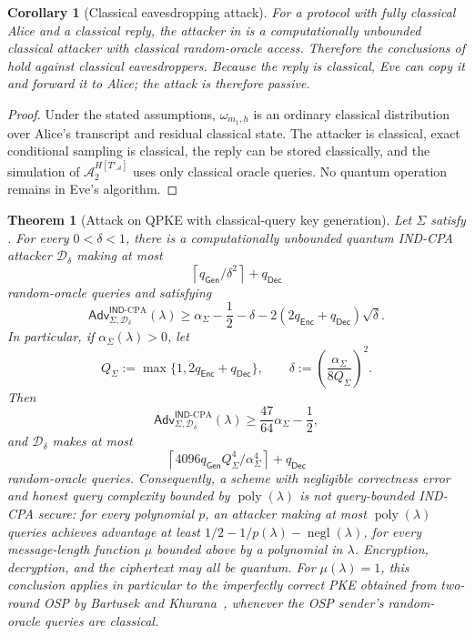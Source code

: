 \documentclass[11pt]{article}
\newcounter{algorithm}
\newtheorem{theorem}{Theorem}[section]
\newtheorem{corollary}[corollary]{Corollary}
\newcommand{\cA}{\mathcal{A}}
\newcommand{\cD}{\mathcal{D}}
\newcommand{\poly}{\operatorname{poly}}
\newcommand{\negl}{\operatorname{negl}}
\newcommand{\Adv}{\mathsf{Adv}}
\newcommand{\Gen}{\mathsf{Gen}}
\newcommand{\Enc}{\mathsf{Enc}}
\newcommand{\Dec}{\mathsf{Dec}}
\newcommand{\IND}{\mathsf{IND}}
\newcommand{\ceil}[1]{\left\lceil #1\right\rceil}
\begin{document}
\begin{corollary}[Classical eavesdropping attack]\label{cor:classical}
For a protocol with fully classical Alice and a classical reply, the
attacker in  is a computationally unbounded classical
attacker with classical random-oracle access.  Therefore the conclusions of
 hold against classical
eavesdroppers. Because the reply is classical, Eve can copy it and forward
it to Alice; the attack is therefore passive.
\end{corollary}

\begin{proof}
Under the stated assumptions, \(\omega_{m_1,h}\) is an ordinary classical
distribution over Alice's transcript and residual classical state.  The
attacker is classical, exact conditional sampling is classical, the reply can
be stored classically, and the simulation of \(\cA_2^{H[T'_{\cA}]}\) uses
only classical oracle queries.  No quantum operation remains in Eve's
algorithm.
\end{proof}

\begin{theorem}[Attack on QPKE with classical-query key generation]
\label{thm:qpke}
Let \(\Sigma\) satisfy .  For every \(0<\delta<1\), there is
a computationally unbounded quantum IND-CPA attacker \(\cD_\delta\) making
at most
\[
  \ceil{q_{\Gen}/\delta^2}+q_{\Dec}
\]
random-oracle queries and satisfying
\[
  \Adv^{\IND\text{-}\mathrm{CPA}}_{\Sigma,\cD_\delta}(\lambda)
  \ge
  \alpha_\Sigma-\frac12-\delta
  -2(2q_{\Enc}+q_{\Dec})\sqrt\delta.
\]
In particular, if \(\alpha_\Sigma(\lambda)>0\), let
\[
  Q_\Sigma:=\max\{1,2q_{\Enc}+q_{\Dec}\},
  \qquad
  \delta:=\left(\frac{\alpha_\Sigma}{8Q_\Sigma}\right)^2.
\]
Then
\[
  \Adv^{\IND\text{-}\mathrm{CPA}}_{\Sigma,\cD_\delta}(\lambda)
  \ge \frac{47}{64}\alpha_\Sigma-\frac12,
\]
and \(\cD_\delta\) makes at most
\[
  \ceil{4096q_{\Gen}Q_\Sigma^4/\alpha_\Sigma^4}+q_{\Dec}
\]
random-oracle queries. Consequently, a scheme with negligible correctness
error and honest query complexity bounded by \(\poly(\lambda)\) is not
query-bounded IND-CPA secure: for every polynomial \(p\), an attacker making
at most \(\poly(\lambda)\) queries achieves advantage at least
\(1/2-1/p(\lambda)-\negl(\lambda)\), for every message-length function \(\mu\)
bounded above by a polynomial in \(\lambda\).
Encryption,
decryption, and the ciphertext may all be quantum. For
\(\mu(\lambda)=1\), this conclusion applies in particular to the
imperfectly correct PKE obtained from two-round OSP by Bartusek and
Khurana~\cite[Theorem~7.9]{BartusekKhurana24}, whenever the OSP sender's
random-oracle queries are classical.
\end{theorem}
\end{document}
